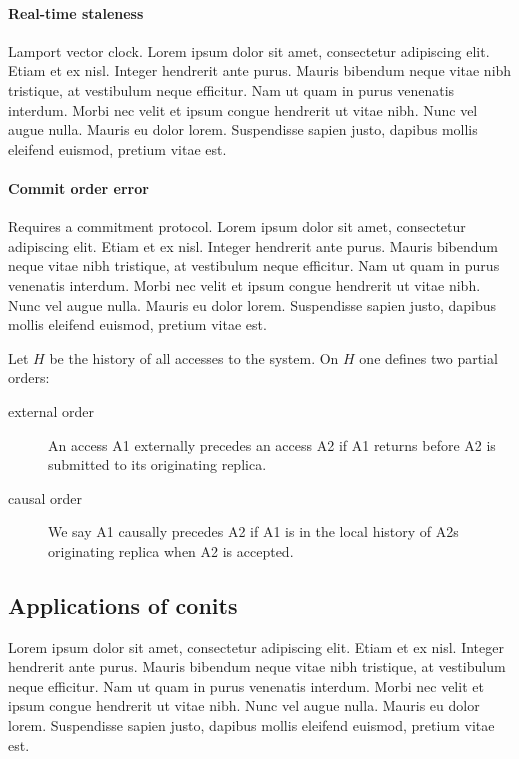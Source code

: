 \paragraph{Real-time staleness}

Lamport vector clock. Lorem ipsum dolor sit amet, consectetur
adipiscing elit. Etiam et ex nisl. Integer hendrerit ante
purus. Mauris bibendum neque vitae nibh tristique, at vestibulum neque
efficitur. Nam ut quam in purus venenatis interdum. Morbi nec velit et
ipsum congue hendrerit ut vitae nibh. Nunc vel augue nulla. Mauris eu
dolor lorem. Suspendisse sapien justo, dapibus mollis eleifend
euismod, pretium vitae est.

\paragraph{Commit order error} Requires a commitment protocol. Lorem ipsum dolor sit amet,
consectetur adipiscing elit. Etiam et ex nisl. Integer hendrerit ante
purus. Mauris bibendum neque vitae nibh tristique, at vestibulum neque
efficitur. Nam ut quam in purus venenatis interdum. Morbi nec velit et
ipsum congue hendrerit ut vitae nibh. Nunc vel augue nulla. Mauris eu
dolor lorem. Suspendisse sapien justo, dapibus mollis eleifend
euismod, pretium vitae est.

Let $H$ be the history of all accesses to the system. On $H$ one
defines two partial orders:
\begin{description}
  \item[external order] An access A1 externally precedes an access A2 if A1 returns
  before A2 is submitted to its originating replica.
  \item[causal order] We say A1 causally precedes A2 if A1 is in the
    local history of A2s originating replica when A2 is accepted.
\end{description}

\subsection{Applications of conits}

Lorem ipsum dolor sit amet, consectetur adipiscing elit. Etiam et ex
nisl. Integer hendrerit ante purus. Mauris bibendum neque vitae nibh
tristique, at vestibulum neque efficitur. Nam ut quam in purus
venenatis interdum. Morbi nec velit et ipsum congue hendrerit ut vitae
nibh. Nunc vel augue nulla. Mauris eu dolor lorem. Suspendisse sapien
justo, dapibus mollis eleifend euismod, pretium vitae est.

